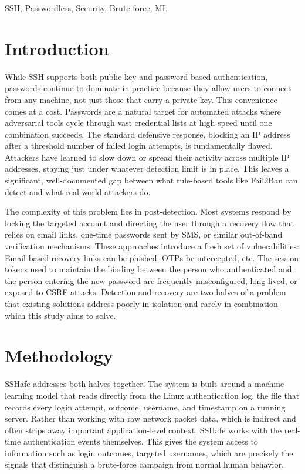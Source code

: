 \documentclass[conference]{IEEEtran}
\begin{document}
\begin{IEEEkeywords}
SSH, Passwordless, Security, Brute force, ML
\end{IEEEkeywords}

\section{Introduction}
While SSH supports both public-key and password-based authentication, passwords continue to dominate in practice because they allow users to connect from any machine, not just those that carry a private key. This convenience comes at a cost. Passwords are a natural target for automated attacks where adversarial tools cycle through vast credential lists at high speed until one combination succeeds. The standard defensive response, blocking an IP address after a threshold number of failed login attempts, is fundamentally flawed. Attackers have learned to slow down or spread their activity across multiple IP addresses, staying just under whatever detection limit is in place. This leaves a significant, well-documented gap between what rule-based tools like Fail2Ban can detect and what real-world attackers do.

The complexity of this problem lies in post-detection. Most systems respond by locking the targeted account and directing the user through a recovery flow that relies on email links, one-time passwords sent by SMS, or similar out-of-band verification mechanisms. These approaches introduce a fresh set of vulnerabilities: Email-based recovery links can be phished, OTPs be intercepted, etc. The session tokens used to maintain the binding between the person who authenticated and the person entering the new password are frequently misconfigured, long-lived, or exposed to CSRF attacks. Detection and recovery are two halves of a problem that existing solutions address poorly in isolation and rarely in combination which this study aims to solve.

\section{Methodology}

SSHafe addresses both halves together. The system is built around a machine learning model that reads directly from the Linux authentication log, the file that records every login attempt, outcome, username, and timestamp on a running server. Rather than working with raw network packet data, which is indirect and often strips away important application-level context, SSHafe works with the real-time authentication events themselves. This gives the system access to information such as login outcomes, targeted usernames, which are precisely the signals that distinguish a brute-force campaign from normal human behavior.
\end{document}
